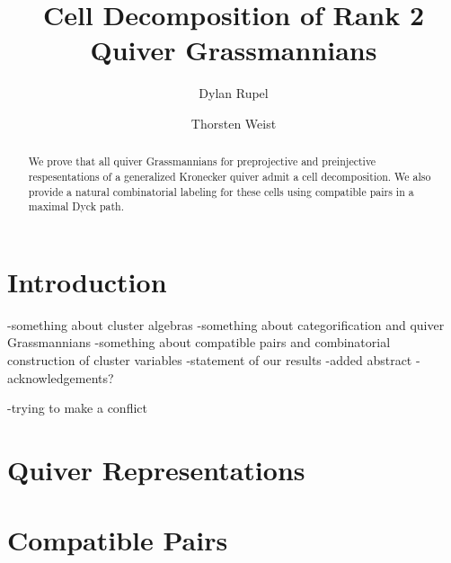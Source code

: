 \documentclass{amsart}
\author{Dylan Rupel}
\author{Thorsten Weist}
\title{Cell Decomposition of Rank 2 Quiver Grassmannians}
\begin{document}
\begin{abstract}
  We prove that all quiver Grassmannians for preprojective and preinjective respesentations of a generalized Kronecker quiver admit a cell decomposition.  
  We also provide a natural combinatorial labeling for these cells using compatible pairs in a maximal Dyck path. 
\end{abstract}
\maketitle

\section{Introduction}
-something about cluster algebras
-something about categorification and quiver Grassmannians
-something about compatible pairs and combinatorial construction of cluster variables
-statement of our results
-added abstract
-acknowledgements?

-trying to make a conflict
\section{Quiver Representations}

\section{Compatible Pairs}
\end{document}
